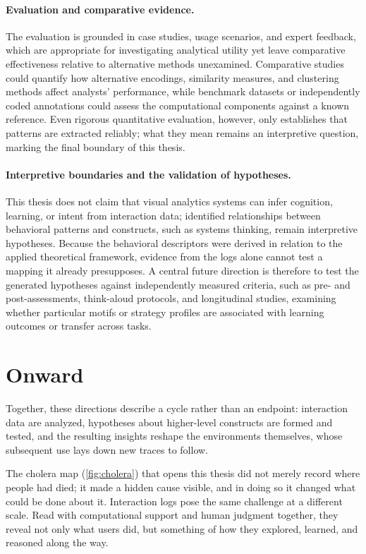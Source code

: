 \paragraph{Evaluation and comparative evidence.}
The evaluation is grounded in case studies, usage scenarios, and expert feedback, which are appropriate for investigating analytical utility yet leave comparative effectiveness relative to alternative methods unexamined.
Comparative studies could quantify how alternative encodings, similarity measures, and clustering methods affect analysts' performance, while benchmark datasets or independently coded annotations could assess the computational components against a known reference.
Even rigorous quantitative evaluation, however, only establishes that patterns are extracted reliably; what they mean remains an interpretive question, marking the final boundary of this thesis.


\paragraph{Interpretive boundaries and the validation of hypotheses.}
This thesis does not claim that visual analytics systems can infer cognition, learning, or intent from interaction data; identified relationships between behavioral patterns and constructs, such as systems thinking, remain interpretive hypotheses.
Because the behavioral descriptors were derived in relation to the applied theoretical framework, evidence from the logs alone cannot test a mapping it already presupposes.
A central future direction is therefore to test the generated hypotheses against independently measured criteria, such as pre- and post-assessments, think-aloud protocols, and longitudinal studies, examining whether particular motifs or strategy profiles are associated with learning outcomes or transfer across tasks.





\section{Onward}

Together, these directions describe a cycle rather than an endpoint: interaction data are analyzed, hypotheses about higher-level constructs are formed and tested, and the resulting insights reshape the environments themselves, whose subsequent use lays down new traces to follow.

The cholera map (\cref{fig:cholera}) that opens this thesis did not merely record where people had died; it made a hidden cause visible, and in doing so it changed what could be done about it.
Interaction logs pose the same challenge at a different scale.
Read with computational support and human judgment together, they reveal not only what users did, but something of how they explored, learned, and reasoned along the way.
